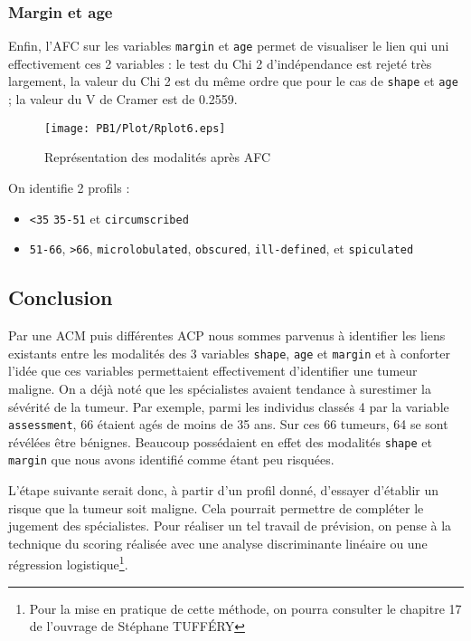 \documentclass[a4paper]{report}
\begin{document}
     \subsubsection{Margin et age}
   Enfin, l'AFC sur les variables \verb|margin| et \verb|age| permet de visualiser le lien qui uni effectivement ces 2 variables : le test du Chi 2 d'indépendance est rejeté très largement, la valeur du Chi 2 est du même ordre que pour le cas de \verb|shape| et \verb|age| ; la valeur du V de Cramer est de 0.2559. 

      \begin{figure}[!ht]
	\centering
     	\texttt{[image: PB1/Plot/Rplot6.eps]}

	\caption{Représentation des modalités après AFC}
\end{figure}

   On identifie 2 profils : 
   \begin{itemize}
      \item \verb|<35| \verb|35-51| et \verb|circumscribed|
   \item \verb|51-66|, \verb|>66|, \verb|microlobulated|, \verb|obscured|, \verb|ill-defined|, et \verb|spiculated|
   \end{itemize}
   
   
  \subsection{Conclusion}
  Par une ACM puis différentes ACP nous sommes parvenus à identifier les liens existants entre les modalités des 3 variables \verb|shape|, \verb|age| et \verb|margin| et à conforter l'idée que ces variables permettaient effectivement d'identifier une tumeur maligne. On a déjà noté que les spécialistes avaient tendance à surestimer la sévérité de la tumeur. Par exemple, parmi les individus classés 4 par la variable \verb|assessment|, 66 étaient agés de moins de 35 ans. Sur ces 66 tumeurs, 64 se sont révélées être bénignes. Beaucoup possédaient en effet des modalités \verb|shape| et \verb|margin| que nous avons identifié comme étant peu risquées.   
  
   L'étape suivante serait donc, à partir d'un profil donné, d'essayer d'établir un risque que la tumeur soit maligne. Cela pourrait permettre de compléter le jugement des spécialistes. Pour réaliser un tel travail de prévision, on pense à la technique du scoring réalisée avec une analyse discriminante linéaire ou une régression logistique\footnote{Pour la mise en pratique de cette méthode, on pourra consulter le chapitre 17 de l'ouvrage de Stéphane TUFFÉRY}.    
  
\end{document}

